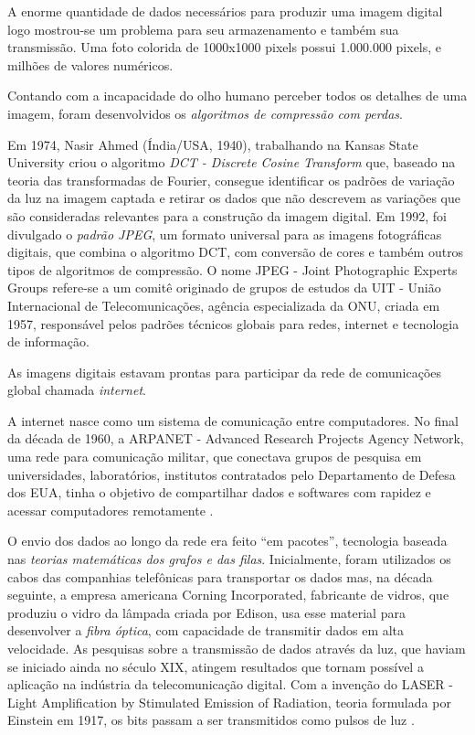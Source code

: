 \documentclass{hipatia}
\begin{document}
A enorme quantidade de dados necessários para produzir uma imagem digital logo mostrou-se um problema para seu armazenamento e também sua transmissão. Uma foto colorida de 1000x1000 pixels possui 1.000.000 pixels, e milhões de valores numéricos.

Contando com a incapacidade do olho humano perceber todos os detalhes de uma imagem, foram desenvolvidos os \textit{algoritmos de compressão com perdas}.

Em 1974, Nasir Ahmed (Índia/USA, 1940), trabalhando na Kansas State University criou o algoritmo \textit{DCT - Discrete Cosine Transform} \cite{Ahmed1974} que, baseado na teoria das transformadas de Fourier, consegue identificar os padrões de variação da luz na imagem captada e retirar os dados que não descrevem as variações que são consideradas relevantes para a construção da imagem digital. Em 1992, foi divulgado o \textit{padrão JPEG}, um formato universal para as imagens fotográficas digitais, que combina o algoritmo DCT, com conversão de cores e também outros tipos de algoritmos de compressão. O nome JPEG - Joint Photographic Experts Groups refere-se a um comitê originado de grupos de estudos da UIT - União Internacional de Telecomunicações, agência especializada da ONU, criada em 1957, responsável pelos padrões técnicos globais para redes, internet e tecnologia de informação.

As imagens digitais estavam prontas para participar da rede de comunicações global chamada \textit{internet}.

A internet nasce como um sistema de comunicação entre computadores. No final da década de 1960, a ARPANET - Advanced Research Projects Agency Network, uma rede para comunicação militar, que conectava grupos de pesquisa em universidades, laboratórios, institutos contratados pelo Departamento de Defesa dos EUA, tinha o objetivo de compartilhar dados e softwares com rapidez e acessar computadores remotamente \cite{Abbate1999}.

O envio dos dados ao longo da rede era feito ``em pacotes'', tecnologia baseada nas \textit{teorias matemáticas dos grafos e das filas}. Inicialmente, foram utilizados os cabos das companhias telefônicas para transportar os dados mas, na década seguinte, a empresa americana Corning Incorporated, fabricante de vidros, que produziu o vidro da lâmpada criada por Edison, usa esse material para desenvolver a \textit{fibra óptica}, com capacidade de transmitir dados em alta velocidade. As pesquisas sobre a transmissão de dados através da luz, que haviam se iniciado ainda no século XIX, atingem resultados que tornam possível a aplicação na indústria da telecomunicação digital. Com a invenção do LASER - Light Amplification by Stimulated Emission of Radiation, teoria formulada por Einstein em 1917, os bits passam a ser transmitidos como pulsos de luz  \cite{Agrawal2012}.
\end{document}
